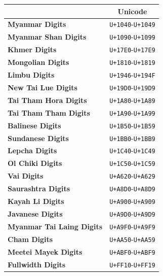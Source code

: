 \documentclass [10pt]{article}
\begin{document}
\begin{center}
  \begin{tabular}{|l|c|}
    \hline
    & \textbf{Unicode} \\ \hline
    \textbf{Myanmar Digits} & \texttt{U+1040}-\texttt{U+1049} \\ \hline
    \textbf{Myanmar Shan Digits} & \texttt{U+1090}-\texttt{U+1099} \\ \hline
    \textbf{Khmer Digits} & \texttt{U+17E0}-\texttt{U+17E9} \\ \hline
    \textbf{Mongolian Digits} & \texttt{U+1810}-\texttt{U+1819} \\ \hline
    \textbf{Limbu Digits} & \texttt{U+1946}-\texttt{U+194F} \\ \hline
    \textbf{New Tai Lue Digits} & \texttt{U+19D0}-\texttt{U+19D9} \\ \hline
    \textbf{Tai Tham Hora Digits} & \texttt{U+1A80}-\texttt{U+1A89} \\ \hline
    \textbf{Tai Tham Tham Digits} & \texttt{U+1A90}-\texttt{U+1A99} \\ \hline
    \textbf{Balinese Digits} & \texttt{U+1B50}-\texttt{U+1B59} \\ \hline
    \textbf{Sundanese Digits} & \texttt{U+1BB0}-\texttt{U+1BB9} \\ \hline
    \textbf{Lepcha Digits} & \texttt{U+1C40}-\texttt{U+1C49} \\ \hline
    \textbf{Ol Chiki Digits} & \texttt{U+1C50}-\texttt{U+1C59} \\ \hline
    \textbf{Vai Digits} & \texttt{U+A620}-\texttt{U+A629} \\ \hline
    \textbf{Saurashtra Digits} & \texttt{U+A8D0}-\texttt{U+A8D9} \\ \hline
    \textbf{Kayah Li Digits} & \texttt{U+A900}-\texttt{U+A909} \\ \hline
    \textbf{Javanese Digits} & \texttt{U+A9D0}-\texttt{U+A9D9} \\ \hline
    \textbf{Myanmar Tai Laing Digits}
    & \texttt{U+A9F0}-\texttt{U+A9F9} \\ \hline
    \textbf{Cham Digits} & \texttt{U+AA50}-\texttt{U+AA59} \\ \hline
    \textbf{Meetei Mayek Digits} & \texttt{U+ABF0}-\texttt{U+ABF9} \\ \hline
    \textbf{Fullwidth Digits} & \texttt{U+FF10}-\texttt{U+FF19} \\ \hline
    \end{tabular}
\end{center}
\end{document}
